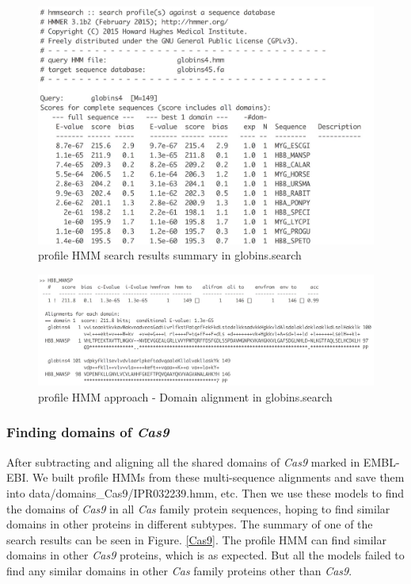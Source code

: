 \documentclass[11pt, oneside]{article}
\begin{document}
\begin{figure}[ht]
  \centering
  \includegraphics[scale = 0.35]{images/hmm_test1}
      \caption{profile HMM search results summary in globins.search}
      \label{hmm_test1}
\end{figure} 

\begin{figure}[ht]
  \centering
  \includegraphics[scale = 0.3]{images/hmm_test2}
      \caption{profile HMM approach -  Domain alignment in globins.search}
      \label{hmm_test2}
\end{figure} 


\subsubsection{Finding domains of \textit{Cas9}}

After subtracting and aligning all the shared domains of \textit{Cas9} marked in EMBL-EBI. We built profile HMMs from these multi-sequence alignments and save them into data/domains\_Cas9/IPR032239.hmm, etc. Then we use these models to find the domains of \textit{Cas9} in all \textit{Cas} family protein sequences, hoping to find similar domains in other proteins in different subtypes. The summary of one of the search results can be seen in Figure. \ref{Cas9}. The profile HMM can find similar domains in other \textit{Cas9} proteins, which is as expected. But all the models failed to find any similar domains in other \textit{Cas} family proteins other than \textit{Cas9}.
\end{document}
